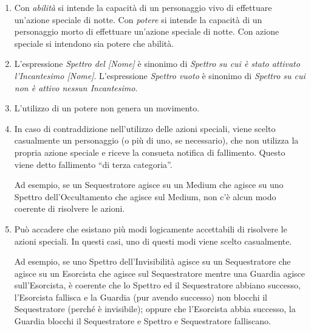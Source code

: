 \documentclass[a4paper,10pt]{article}
\begin{document}
\begin{enumerate}

	\item Con \emph{abilità} si intende la capacità di un personaggio vivo di effettuare un'azione speciale di notte. Con \emph{potere} si intende la capacità di un personaggio morto di effettuare un'azione speciale di notte. Con azione speciale si intendono sia potere che abilità.

	\item L'espressione \emph{Spettro del [Nome]} è sinonimo di \emph{Spettro su cui è stato attivato l'Incantesimo [Nome]}. L'espressione \emph{Spettro vuoto} è sinonimo di \emph{Spettro su cui non è attivo nessun Incantesimo}.

	\item L'utilizzo di un potere non genera un movimento.

	\item In caso di contraddizione nell'utilizzo delle azioni speciali, viene scelto casualmente un personaggio (o più di uno, se necessario), che non utilizza la propria azione speciale e riceve la consueta notifica di fallimento. Questo viene detto fallimento ``di terza categoria''.

	      Ad esempio, se un Sequestratore agisce su un Medium che agisce su uno Spettro dell'Occultamento che agisce sul Medium, non c'è alcun modo coerente di risolvere le azioni.


	\item Può accadere che esistano più modi logicamente accettabili di risolvere le azioni speciali. In questi casi, uno di questi modi viene scelto casualmente.

	      Ad esempio, se uno Spettro dell'Invisibilità agisce su un Sequestratore che agisce su un Esorcista che agisce sul Sequestratore mentre una Guardia agisce sull'Esorcista, è coerente che lo Spettro ed il Sequestratore abbiano successo, l'Esorcista fallisca e la Guardia (pur avendo successo) non blocchi il Sequestratore (perché è invisibile); oppure che l'Esorcista abbia successo, la Guardia blocchi il Sequestratore e Spettro e Sequestratore falliscano.



\end{enumerate}
\end{document}
